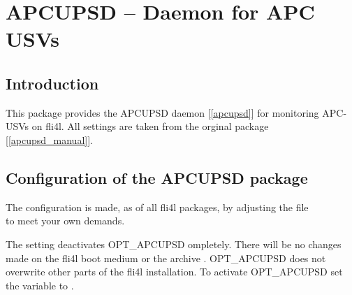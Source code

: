 \section {APCUPSD -- Daemon for APC USVs}

\subsection{Introduction}

  This package provides the APCUPSD daemon {[\ref{apcupsd}]} for monitoring
  APC-USVs on fli4l. All settings are taken from the orginal package
  {[\ref{apcupsd_manual}]}.
 
\subsection {Configuration of the APCUPSD package}
     
  The configuration is made, as of all fli4l packages, by adjusting the file\\
   to meet your own demands.
     
\begin{description}


  The setting   deactivates OPT\_APCUPSD ompletely. There will be no
  changes made on the fli4l boot medium or the archive .
  OPT\_APCUPSD does not overwrite other parts of the fli4l installation.
  To activate OPT\_APCUPSD set the variable  to .

\end{description}

